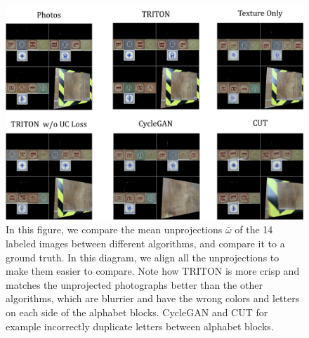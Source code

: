 		\begin{figure}[H]
			\begin{center}
				\includegraphics[width=400pt]{../images/unprojection_comparisons.pdf}
			\end{center}
			\caption{
				In this figure, we compare the mean unprojections $\bar{\omega}$ of the 14 labeled images between different algorithms, and compare it to a ground truth. In this diagram, we align all the unprojections to make them easier to compare. Note how TRITON is more crisp and matches the unprojected photographs better than the other algorithms, which are blurrier and have the wrong colors and letters on each side of the alphabet blocks. CycleGAN and CUT for example incorrectly duplicate letters between alphabet blocks.
			}
			\label{fig:unprojection_resolution_comparison}
		\end{figure}

		

	


	

	



